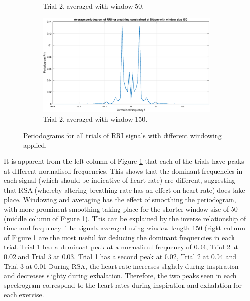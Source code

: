 \begin{figure}[H]
\begin{subfigure}{.32\textwidth}
  \caption{Trial 2, averaged with window 50.}
\end{subfigure}
\begin{subfigure}{.32\textwidth}
  \centering
  \includegraphics[width=\linewidth]{assignment3figs/new_pgm_con50_ave150.eps}  
  \caption{Trial 2, averaged with window 150.}
\end{subfigure}
\caption{Periodograms for all trials of RRI signals with different windowing applied.}
\label{fig:RRIspecs}
\end{figure}

\noindent
It is apparent from the left column of Figure \ref{fig:RRIspecs} that each of the trials have peaks at different normalised frequencies. This shows that the dominant frequencies in each signal (which should  be indicative of heart rate) are different, suggesting that RSA (whereby altering breathing rate has an effect on heart rate) does take place. Windowing and averaging has the effect of smoothing the periodogram, with more prominent smoothing taking place for the shorter window size of 50 (middle column of Figure \ref{fig:RRIspecs}). This can be explained by the inverse relationship of time and frequency. The signals averaged using window length 150 (right column of Figure \ref{fig:RRIspecs} are the most useful for deducing the dominant frequencies in each trial. Trial 1 has a dominant peak at a normalised frequency of 0.04, Trial 2 at 0.02 and Trial 3 at 0.03. Trial 1 has a second peak at 0.02, Trial 2 at 0.04 and Trial 3 at 0.01 During RSA, the heart rate increases slightly during inspiration and decreases slighty during exhalation. Therefore, the two peaks seen in each spectrogram correspond to the heart rates during inspiration and exhalation for each exercise.